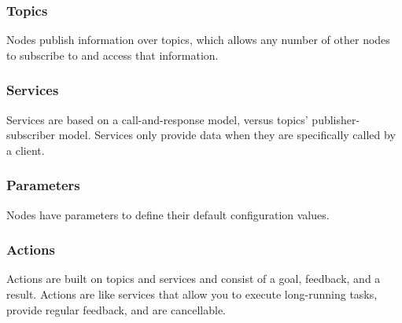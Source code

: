 \subsubsection{Topics}
 Nodes publish information over topics, which allows any number of other nodes to subscribe to and access that information. \cite{ros2_documentation}

\subsubsection{Services}
Services are based on a call-and-response model, versus topics’ publisher-subscriber model. Services only provide data when they are specifically called by a client. \cite{ros2_documentation}

\subsubsection{Parameters}
Nodes have parameters to define their default configuration values. \cite{ros2_documentation}

\subsubsection{Actions}
Actions are built on topics and services and consist of a goal, feedback, and a result. Actions are like services that allow you to execute long-running tasks, provide regular feedback, and are cancellable. \cite{ros2_documentation}

\lipsum[1]